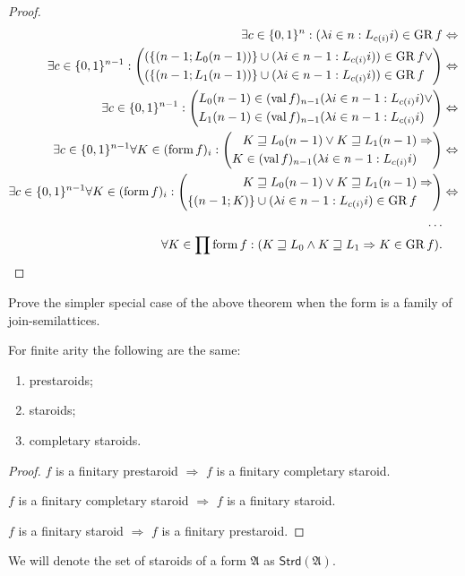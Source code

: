 \begin{proof}
~
\begin{align*}
\exists c\in\{0,1\}^{n}:(\lambda i\in n:L_{c(i)}i)\in\operatorname{GR} f & \Leftrightarrow\\
\exists c\in\{0,1\}^{n-1}:\left(\begin{aligned}(\{(n-1;L_{0}(n-1))\}\cup(\lambda i\in n-1:L_{c(i)}i))\in\operatorname{GR} f & \lor\\
(\{(n-1;L_{1}(n-1))\}\cup(\lambda i\in n-1:L_{c(i)}i))\in\operatorname{GR} f
\end{aligned}
\right) & \Leftrightarrow\\
\exists c\in\{0,1\}^{n-1}:\left(\begin{aligned}L_{0}(n-1)\in(\operatorname{val} f)_{n-1}(\lambda i\in n-1:L_{c(i)}i) & \lor\\
L_{1}(n-1)\in(\operatorname{val} f)_{n-1}(\lambda i\in n-1:L_{c(i)}i)
\end{aligned}
\right) & \Leftrightarrow\\
\exists c\in\{0,1\}^{n-1}\forall K\in(\operatorname{form} f)_{i}:\left(\begin{aligned}K\sqsupseteq L_{0}(n-1)\lor K\sqsupseteq L_{1}(n-1) & \Rightarrow\\
K\in(\operatorname{val} f)_{n-1}(\lambda i\in n-1:L_{c(i)}i)
\end{aligned}
\right) & \Leftrightarrow\\
\exists c\in\{0,1\}^{n-1}\forall K\in(\operatorname{form} f)_{i}:\left(\begin{aligned}K\sqsupseteq L_{0}(n-1)\lor K\sqsupseteq L_{1}(n-1) & \Rightarrow\\
\{(n-1;K)\}\cup(\lambda i\in n-1:L_{c(i)}i)\in\operatorname{GR} f
\end{aligned}
\right) & \Leftrightarrow\\
\dots\\
\forall K\in\prod\operatorname{form} f:(K\sqsupseteq L_{0}\wedge K\sqsupseteq L_{1}\Rightarrow K\in\operatorname{GR} f).
\end{align*}
\end{proof}
\begin{xca}
Prove the simpler special case of the above theorem when the form
is a family of join-semilattices.\end{xca}
\begin{thm}
For finite arity the following are the same:
\begin{enumerate}
\item prestaroids;
\item staroids;
\item completary staroids.
\end{enumerate}
\end{thm}
\begin{proof}
$f$ is a finitary prestaroid $\Rightarrow$ $f$ is a finitary completary
staroid.

$f$ is a finitary completary staroid $\Rightarrow$ $f$ is a finitary
staroid.

$f$ is a finitary staroid $\Rightarrow$ $f$ is a finitary prestaroid.\end{proof}
\begin{defn}
We will denote the set of staroids of a form $\mathfrak{A}$
as $\mathsf{Strd}(\mathfrak{A})$.
\end{defn}


